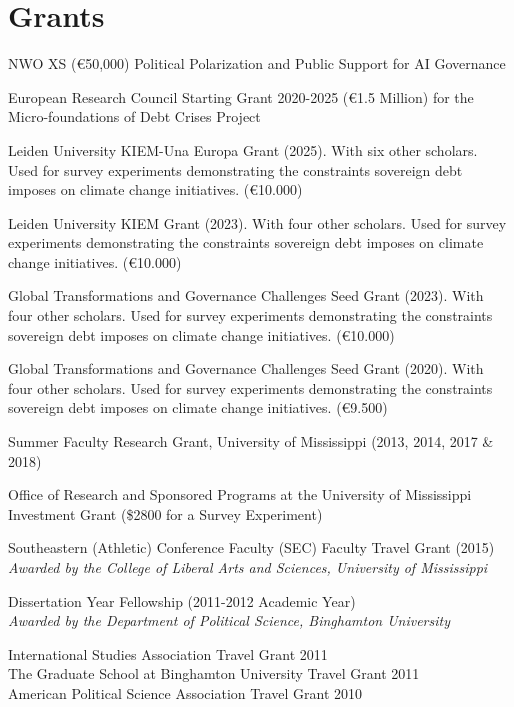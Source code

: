 \documentclass[letterpaper]{article}
\renewenvironment{itemize}{
  \begin{list}{}{
    \setlength{\leftmargin}{1.75em}
  }
}{
  \end{list}
}
\begin{document}
\section*{Grants}
	\begin{itemize}
    \item NWO XS (\euro 50,000) Political Polarization and Public Support for AI Governance
    \item European Research Council Starting Grant 2020-2025 (\euro{1.5} Million) for the Micro-foundations of Debt Crises Project 
    \item Leiden University KIEM-Una Europa Grant (2025).  With six other scholars. Used for survey experiments demonstrating the constraints sovereign debt imposes on climate change initiatives. (\euro10.000)
    \item Leiden University KIEM Grant (2023).  With four other scholars. Used for survey experiments demonstrating the constraints sovereign debt imposes on climate change initiatives. (\euro10.000)
	\item Global Transformations and Governance Challenges Seed Grant (2023).  With four other scholars. Used for survey experiments demonstrating the constraints sovereign debt imposes on climate change initiatives. (\euro10.000)
	\item Global Transformations and Governance Challenges Seed Grant (2020).  With four other scholars. Used for survey experiments demonstrating the constraints sovereign debt imposes on climate change initiatives. (\euro9.500)
	\item Summer Faculty Research Grant, University of Mississippi (2013, 2014, 2017 \& 2018) 
	\item Office of Research and Sponsored Programs at the University of Mississippi Investment Grant (\$2800 for a Survey Experiment)
	\item Southeastern (Athletic) Conference Faculty (SEC) Faculty Travel Grant (2015) 
	 \textit{Awarded by the College of Liberal Arts and Sciences, University of Mississippi}
	\item Dissertation Year Fellowship (2011-2012 Academic Year)\\
	\textit{Awarded by the Department of Political Science, Binghamton University}
	\item International Studies Association Travel Grant 2011 \\
	The Graduate School at Binghamton University Travel Grant 2011 \\
	American Political Science Association Travel Grant 2010	
\end{itemize}
\end{document}
